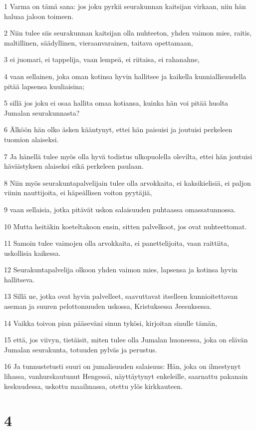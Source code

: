 \par 1 Varma on tämä sana: jos joku pyrkii seurakunnan kaitsijan virkaan, niin hän haluaa jaloon toimeen.
\par 2 Niin tulee siis seurakunnan kaitsijan olla nuhteeton, yhden vaimon mies, raitis, maltillinen, säädyllinen, vieraanvarainen, taitava opettamaan,
\par 3 ei juomari, ei tappelija, vaan lempeä, ei riitaisa, ei rahanahne,
\par 4 vaan sellainen, joka oman kotinsa hyvin hallitsee ja kaikella kunniallisuudella pitää lapsensa kuuliaisina;
\par 5 sillä jos joku ei osaa hallita omaa kotiansa, kuinka hän voi pitää huolta Jumalan seurakunnasta?
\par 6 Älköön hän olko äsken kääntynyt, ettei hän paisuisi ja joutuisi perkeleen tuomion alaiseksi.
\par 7 Ja hänellä tulee myös olla hyvä todistus ulkopuolella olevilta, ettei hän joutuisi häväistyksen alaiseksi eikä perkeleen paulaan.
\par 8 Niin myös seurakuntapalvelijain tulee olla arvokkaita, ei kaksikielisiä, ei paljon viinin nauttijoita, ei häpeällisen voiton pyytäjiä,
\par 9 vaan sellaisia, jotka pitävät uskon salaisuuden puhtaassa omassatunnossa.
\par 10 Mutta heitäkin koeteltakoon ensin, sitten palvelkoot, jos ovat nuhteettomat.
\par 11 Samoin tulee vaimojen olla arvokkaita, ei panettelijoita, vaan raittiita, uskollisia kaikessa.
\par 12 Seurakuntapalvelija olkoon yhden vaimon mies, lapsensa ja kotinsa hyvin hallitseva.
\par 13 Sillä ne, jotka ovat hyvin palvelleet, saavuttavat itselleen kunnioitettavan aseman ja suuren pelottomuuden uskossa, Kristuksessa Jeesuksessa.
\par 14 Vaikka toivon pian pääseväni sinun tykösi, kirjoitan sinulle tämän,
\par 15 että, jos viivyn, tietäisit, miten tulee olla Jumalan huoneessa, joka on elävän Jumalan seurakunta, totuuden pylväs ja perustus.
\par 16 Ja tunnustetusti suuri on jumalisuuden salaisuus: Hän, joka on ilmestynyt lihassa, vanhurskautunut Hengessä, näyttäytynyt enkeleille, saarnattu pakanain keskuudessa, uskottu maailmassa, otettu ylös kirkkauteen.

\chapter{4}

